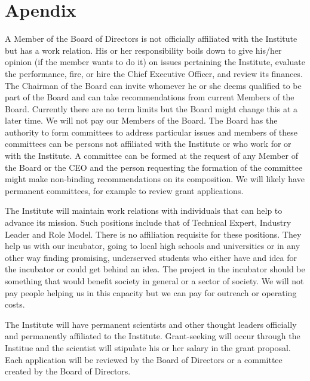 \section{Apendix}

A Member of the Board of Directors is not officially affiliated with the Institute but has a work relation. His or her responsibility boils down to give his/her opinion (if the member wants to do it) on issues pertaining the Institute, evaluate the performance, fire, or hire the Chief Executive Officer, and review its finances. The Chairman of the Board can invite whomever he or she deems qualified to be part of the Board and can take recommendations from current Members of the Board. Currently there are no term limits but the Board might change this at a later time. We will not pay our Members of the Board. The Board has the authority to form committees to address particular issues and members of these committees can be persons not affiliated with the Institute or who work for or with the Institute. A committee can be formed at the request of any Member of the Board or the CEO and the person requesting the formation of the committee might make non-binding recommendations on its composition. We will likely have permanent committees, for example to review grant applications.

The Institute will maintain work relations with individuals that can help to advance its mission. Such positions include that of Technical Expert, Industry Leader and Role Model. There is no affiliation requisite for these positions. They help us with our incubator, going to local high schools and universities or in any other way finding promising, underserved students who either have and idea for the incubator or could get behind an idea. The project in the incubator should be something that would benefit society in general or a sector of society. We will not pay people helping us in this capacity but we can pay for outreach or operating costs.

The Institute will have permanent scientists and other thought leaders officially and permanently affiliated to the Institute. Grant-seeking will occur through the Institue and the scientist will stipulate his or her salary in the grant proposal. Each application will be reviewed by the Board of Directors or a committee created by the Board of Directors.